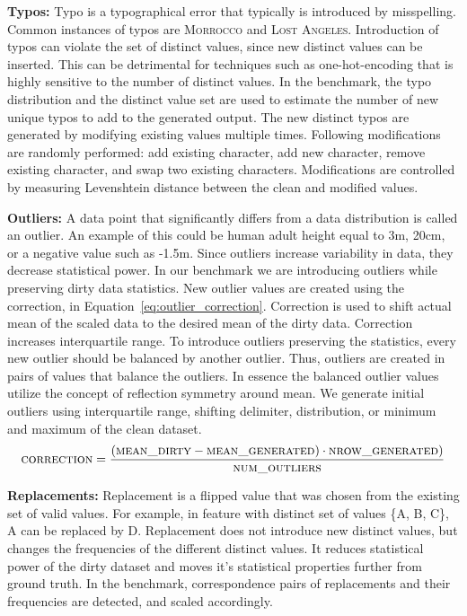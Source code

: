 \textbf{Typos:} 
Typo is a typographical error that typically is introduced by misspelling. 
Common instances of typos are \textsc{Morrocco} and \textsc{Lost Angeles}. 
Introduction of typos can violate the set of distinct values, since new distinct values can be inserted.
This can be detrimental for techniques such as one-hot-encoding that is highly sensitive to the number of distinct values.
In the benchmark, the typo distribution and the distinct value set are used to estimate the number of new unique typos to add to the generated output. 
The new distinct typos are generated by modifying existing values multiple times.
Following modifications are randomly performed: add existing character, add new character, remove existing character, and swap two existing characters.
Modifications are controlled by measuring Levenshtein distance between the clean and modified values. 

\textbf{Outliers:} 
A data point that significantly differs from a data distribution is called an outlier.
An example of this could be human adult height equal to 3m, 20cm, or a negative value such as -1.5m. 
Since outliers increase variability in data, they decrease statistical power.
In our benchmark we are introducing outliers while preserving dirty data statistics. 
New outlier values are created using the correction, in Equation~\ref{eq:outlier_correction}. 
Correction is used to shift actual mean of the scaled data to the desired mean of the dirty data.
Correction increases interquartile range.
To introduce outliers preserving the statistics, every new outlier should be balanced by another outlier. Thus, outliers are created in pairs of values that balance the outliers. 
In essence the balanced outlier values utilize the concept of reflection symmetry around mean.  
We generate initial outliers using interquartile range, shifting delimiter, distribution, or minimum and maximum of the clean dataset.
\begin{equation}
\label{eq:outlier_correction}
\textsc{correction} = \frac{(\textsc{mean\_dirty} - \textsc{mean\_generated}) \cdot \textsc{nrow\_generated})}{\textsc{num\_outliers}}
\end{equation}

\textbf{Replacements:} 
Replacement is a flipped value that was chosen from the existing set of valid values. 
For example, in feature with distinct set of values \textsc{\{A, B, C\}}, \textsc{A} can be replaced by \textsc{D}. 
Replacement does not introduce new distinct values, but changes the frequencies of the different distinct values. 
It reduces statistical power of the dirty dataset and moves it's statistical properties further from ground truth.
In the benchmark, correspondence pairs of replacements and their frequencies are detected, and scaled accordingly. 

